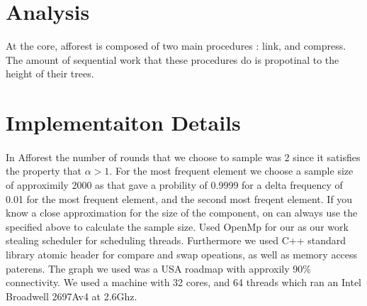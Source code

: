\documentclass[]{article}
\begin{document}
\section{Analysis}
At the core, afforest is composed of two main procedures : link, and compress. The amount of sequential work that these procedures do is propotinal to the height of their trees.
\section{Implementaiton Details}

\paragraph{}
In Afforest the number of rounds that we choose to sample was $2$ since it satisfies the property that $\alpha > 1$.
For the most frequent element we choose a sample size of approximily 2000 as that gave a probility of 0.9999 for a delta frequency of 0.01 for the most frequent element, and the second most freqent element.
If you know a close approximation for the size of the component, on can always use the specified above to calculate the sample size.
Used OpenMp for our as our work stealing scheduler for scheduling threads.
Furthermore we used C++ standard library atomic header for compare and swap opeations, as well as memory access paterens.
The graph we used was a USA roadmap with approxily 90\% connectivity.
We used a machine with 32 cores, and 64 threads which ran an Intel Broadwell 2697Av4 at 2.6Ghz.
\end{document}
